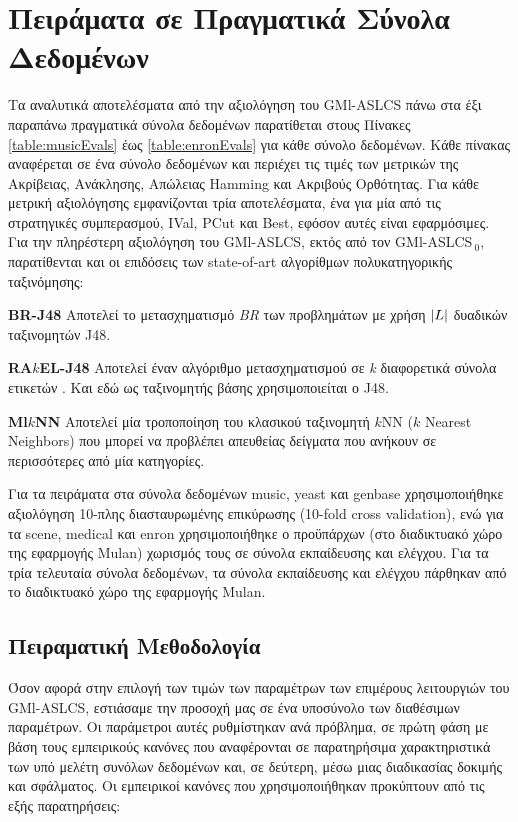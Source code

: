 \section{Πειράματα σε Πραγματικά Σύνολα Δεδομένων}
Τα αναλυτικά αποτελέσματα από την αξιολόγηση του GMl-ASLCS πάνω στα έξι παραπάνω πραγματικά σύνολα δεδομένων παρατίθεται στους Πίνακες \ref{table:musicEvals} έως \ref{table:enronEvals} για κάθε σύνολο δεδομένων. Κάθε πίνακας αναφέρεται σε ένα σύνολο δεδομένων και περιέχει τις τιμές των μετρικών της Ακρίβειας, Ανάκλησης, Απώλειας Hamming και Ακριβούς Ορθότητας. Για κάθε μετρική αξιολόγησης εμφανίζονται τρία αποτελέσματα, ένα για μία από τις στρατηγικές συμπερασμού, IVal, PCut και Best, εφόσον αυτές είναι εφαρμόσιμες. Για την πληρέστερη αξιολόγηση του GMl-ASLCS, εκτός από τον GMl-ASLCS$_{\:0}$, παρατίθενται και οι επιδόσεις των state-of-art αλγορίθμων πολυκατηγορικής ταξινόμησης:

\begin{description}
\item \textbf{BR-J48} Αποτελεί το μετασχηματισμό \emph{BR} των προβλημάτων με χρήση $\lvert L\rvert$ δυαδικών ταξινομητών J48.
\item \textbf{RA$k$EL-J48} Αποτελεί έναν αλγόριθμο μετασχηματισμού σε \emph{k} διαφορετικά σύνολα ετικετών \cite{tsoumakas2007random}. Και εδώ ως ταξινομητής βάσης χρησιμοποιείται ο J48.
\item \textbf{Ml$k$NN} Αποτελεί μία τροποποίηση του κλασικού ταξινομητή $k$NN ($k$ Nearest Neighbors) που μπορεί να προβλέπει απευθείας δείγματα που ανήκουν σε περισσότερες από μία κατηγορίες.
\end{description}

Για τα πειράματα στα σύνολα δεδομένων music, yeast και genbase χρησιμοποιήθηκε αξιολόγηση 10-πλης διασταυρωμένης επικύρωσης (10-fold cross validation), ενώ για τα scene, medical και enron χρησιμοποιήθηκε ο προϋπάρχων (στο διαδικτυακό χώρο της εφαρμογής Mulan) χωρισμός τους σε σύνολα εκπαίδευσης και ελέγχου. Για τα τρία τελευταία σύνολα δεδομένων, τα σύνολα εκπαίδευσης και ελέγχου πάρθηκαν από το διαδικτυακό χώρο της εφαρμογής Mulan.

\subsection{Πειραματική Μεθοδολογία}
\label{subsec:realDatasetsExperiments}
Όσον αφορά στην επιλογή των τιμών των παραμέτρων των επιμέρους λειτουργιών του GMl-ASLCS, εστιάσαμε την προσοχή μας σε ένα υποσύνολο των διαθέσιμων παραμέτρων. Οι παράμετροι αυτές ρυθμίστηκαν ανά πρόβλημα, σε πρώτη φάση με βάση τους εμπειρικούς κανόνες που αναφέρονται σε παρατηρήσιμα χαρακτηριστικά των υπό μελέτη συνόλων δεδομένων και, σε δεύτερη, μέσω μιας διαδικασίας δοκιμής και σφάλματος. Οι εμπειρικοί κανόνες που χρησιμοποιήθηκαν προκύπτουν από τις εξής παρατηρήσεις:

